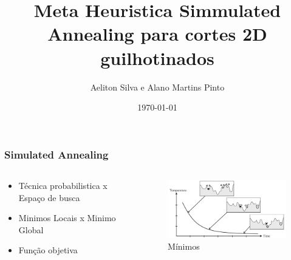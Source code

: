 \documentclass[aspectratio=169]{beamer}
\title[\sc{Projeto e Análise de Algotimos}]{Meta Heuristica Simmulated Annealing para cortes 2D guilhotinados}
\author[Alano Martins Pinto]{Aeliton Silva e Alano Martins Pinto }
\institute{UECE - Universidade Estadual do Ceará} %
\date{\today}
\theoremstyle{Definition}
\begin{document}
\begin{frame}
\titlepage
\end{frame}


\begin{frame}
	\frametitle{Simulated Annealing}
	
		\begin{columns}
		\begin{column}{0.5\textwidth}
		   \begin{itemize}
		   		\item Técnica probabilistica x Espaço de busca
				\item Minimos Locais x Minimo Global
				\item Função objetiva
			\end{itemize}
		\end{column}
		\begin{column}{0.5\textwidth}  %
    		\begin{figure}[h]
	   	 		\includegraphics[width=7.5cm]{imagens/sa}
			    \caption{Mínimos}
	  		\end{figure}
		\end{column}
	\end{columns}
\end{frame}
\end{document}
